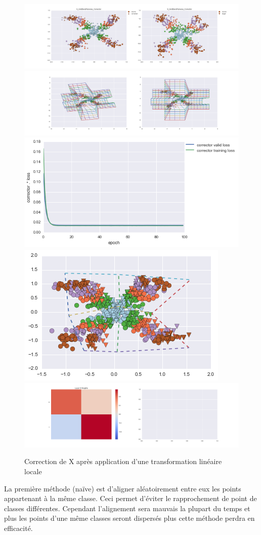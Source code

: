 \begin{figure}[H] %
\centering
\includegraphics[width=\linewidth]{fig/24-05-2016/X/X_GridBendPairwise_Corrector-DATA.png}
\includegraphics[width=\linewidth]{fig/24-05-2016/X/X_GridBendPairwise_Corrector-GridCheck.png}
\includegraphics[width=0.45\linewidth]{fig/24-05-2016/X/X_GridBendPairwise_Corrector-Learning_curve.png}
\includegraphics[width=0.45\linewidth]{fig/24-05-2016/X/X_grid.png}
\includegraphics[width=\linewidth]{fig/24-05-2016/X/X_GridBendPairwise_Corrector-W.png}
\caption{Correction de X après application d'une transformation linéaire locale}
\label{fig:recap-X-GridBend-pairwise}
\end{figure}
La première méthode (naïve) est d'aligner aléatoirement entre eux les points appartenant à la même classe.
Ceci permet d'éviter le rapprochement de point de classes différentes. Cependant l'alignement sera mauvais
la plupart du temps et plus les points d'une même classes seront dispersés plus cette méthode perdra en efficacité.

